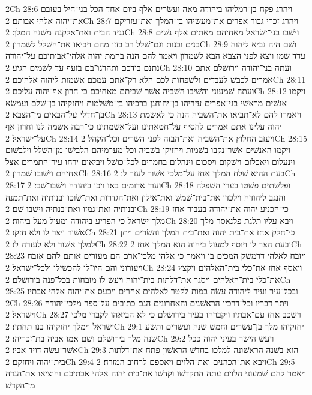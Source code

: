 2Ch 28:6  ויהרג פקח בן־רמליהו ביהודה מאה ועשׂרים אלף ביום אחד הכל בני־חיל בעזבם את־יהוה אלהי אבותם׃
2Ch 28:7  ויהרג זכרי גבור אפרים את־מעשׂיהו בן־המלך ואת־עזריקם נגיד הבית ואת־אלקנה משׁנה המלך׃
2Ch 28:8  וישׁבו בני־ישׂראל מאחיהם מאתים אלף נשׁים בנים ובנות וגם־שׁלל רב בזזו מהם ויביאו את־השׁלל לשׁמרון׃
2Ch 28:9  ושׁם היה נביא ליהוה עדד שׁמו ויצא לפני הצבא הבא לשׁמרון ויאמר להם הנה בחמת יהוה אלהי־אבותיכם על־יהודה נתנם בידכם ותהרגו־בם בזעף עד לשׁמים הגיע׃
2Ch 28:10  ועתה בני־יהודה וירושׁלם אתם אמרים לכבשׁ לעבדים ולשׁפחות לכם הלא רק־אתם עמכם אשׁמות ליהוה אלהיכם׃
2Ch 28:11  ועתה שׁמעוני והשׁיבו השׁביה אשׁר שׁביתם מאחיכם כי חרון אף־יהוה עליכם׃
2Ch 28:12  ויקמו אנשׁים מראשׁי בני־אפרים עזריהו בן־יהוחנן ברכיהו בן־משׁלמות ויחזקיהו בן־שׁלם ועמשׂא בן־חדלי על־הבאים מן־הצבא׃
2Ch 28:13  ויאמרו להם לא־תביאו את־השׁביה הנה כי לאשׁמת יהוה עלינו אתם אמרים להסיף על־חטאתינו ועל־אשׁמתינו כי־רבה אשׁמה לנו וחרון אף על־ישׂראל׃
2Ch 28:14  ויעזב החלוץ את־השׁביה ואת־הבזה לפני השׂרים וכל־הקהל׃
2Ch 28:15  ויקמו האנשׁים אשׁר־נקבו בשׁמות ויחזיקו בשׁביה וכל־מערמיהם הלבישׁו מן־השׁלל וילבשׁום וינעלום ויאכלום וישׁקום ויסכום וינהלום בחמרים לכל־כושׁל ויביאום ירחו עיר־התמרים אצל אחיהם וישׁובו שׁמרון׃
2Ch 28:16  בעת ההיא שׁלח המלך אחז על־מלכי אשׁור לעזר לו׃
2Ch 28:17  ועוד אדומים באו ויכו ביהודה וישׁבו־שׁבי׃
2Ch 28:18  ופלשׁתים פשׁטו בערי השׁפלה והנגב ליהודה וילכדו את־בית־שׁמשׁ ואת־אילון ואת־הגדרות ואת־שׂוכו ובנותיה ואת־תמנה ובנותיה ואת־גמזו ואת־בנתיה וישׁבו שׁם׃
2Ch 28:19  כי־הכניע יהוה את־יהודה בעבור אחז מלך־ישׂראל כי הפריע ביהודה ומעול מעל ביהוה׃
2Ch 28:20  ויבא עליו תלגת פלנאסר מלך אשׁור ויצר לו ולא חזקו׃
2Ch 28:21  כי־חלק אחז את־בית יהוה ואת־בית המלך והשׂרים ויתן למלך אשׁור ולא לעזרה לו׃
2Ch 28:22  ובעת הצר לו ויוסף למעול ביהוה הוא המלך אחז׃
2Ch 28:23  ויזבח לאלהי דרמשׂק המכים בו ויאמר כי אלהי מלכי־ארם הם מעזרים אותם להם אזבח ויעזרוני והם היו־לו להכשׁילו ולכל־ישׂראל׃
2Ch 28:24  ויאסף אחז את־כלי בית־האלהים ויקצץ את־כלי בית־האלהים ויסגר את־דלתות בית־יהוה ויעשׂ לו מזבחות בכל־פנה בירושׁלם׃
2Ch 28:25  ובכל־עיר ועיר ליהודה עשׂה במות לקטר לאלהים אחרים ויכעס את־יהוה אלהי אבתיו׃
2Ch 28:26  ויתר דבריו וכל־דרכיו הראשׁנים והאחרונים הנם כתובים על־ספר מלכי־יהודה וישׂראל׃
2Ch 28:27  וישׁכב אחז עם־אבתיו ויקברהו בעיר בירושׁלם כי לא הביאהו לקברי מלכי ישׂראל וימלך יחזקיהו בנו תחתיו׃
2Ch 29:1  יחזקיהו מלך בן־עשׂרים וחמשׁ שׁנה ועשׂרים ותשׁע שׁנה מלך בירושׁלם ושׁם אמו אביה בת־זכריהו׃
2Ch 29:2  ויעשׂ הישׁר בעיני יהוה ככל אשׁר־עשׂה דויד אביו׃
2Ch 29:3  הוא בשׁנה הראשׁונה למלכו בחדשׁ הראשׁון פתח את־דלתות בית־יהוה ויחזקם׃
2Ch 29:4  ויבא את־הכהנים ואת־הלוים ויאספם לרחוב המזרח׃
2Ch 29:5  ויאמר להם שׁמעוני הלוים עתה התקדשׁו וקדשׁו את־בית יהוה אלהי אבתיכם והוציאו את־הנדה מן־הקדשׁ׃
